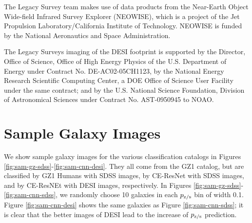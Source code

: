 \documentclass[twocolumn]{aastex631}
\begin{document}
The Legacy Survey team makes use of data products from the Near-Earth Object Wide-field Infrared Survey Explorer (NEOWISE), which is a project of the Jet Propulsion Laboratory/California Institute of Technology. NEOWISE is funded by the National Aeronautics and Space Administration.

The Legacy Surveys imaging of the DESI footprint is supported by the Director, Office of Science, Office of High Energy Physics of the U.S. Department of Energy under Contract No. DE-AC02-05CH1123, by the National Energy Research Scientific Computing Center, a DOE Office of Science User Facility under the same contract; and by the U.S. National Science Foundation, Division of Astronomical Sciences under Contract No. AST-0950945 to NOAO.



{}




\appendix

\section{Sample Galaxy Images}
\label{sec:sample}

We show sample galaxy images for the various classification catalogs in Figures \ref{fig:sam-gz-sdss}-\ref{fig:sam-cnn-desi}.
They all come from the GZ1 catalog, but are classified by GZ1 Humans with SDSS images, by CE-ResNet with SDSS images, and by CE-ResNEt with DESI images, respectively.
In Figures \ref{fig:sam-gz-sdss}-\ref{fig:sam-cnn-sdss}, we randomly choose 10 galaxies in each $p_{\rm z/s}$ bin of width 0.1.
Figure \ref{fig:sam-cnn-desi} shows the same galaxies as Figure \ref{fig:sam-cnn-sdss}; it is clear that the better images of DESI lead to the increase of $p_{\rm z/s}$ prediction.
\end{document}
